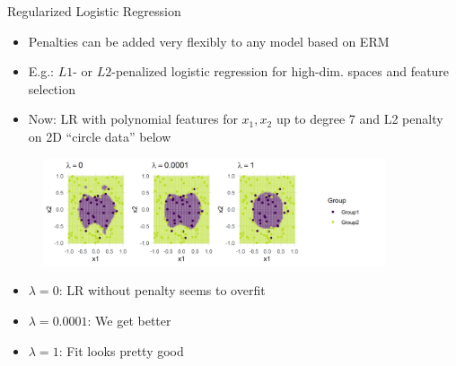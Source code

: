 \documentclass[11pt,compress,t,notes=noshow, xcolor=table]{beamer}
\begin{document}

\begin{vbframe}{Regularized Logistic Regression}

\begin{itemize}

\item Penalties can be added very flexibly to any model based on ERM

\item E.g.: $L1$- or $L2$-penalized logistic regression for high-dim. spaces and feature selection



\item Now: LR with polynomial features for $x_1, x_2$ up to degree 7 and L2 penalty on 2D ``circle data'' below

\end{itemize}

\begin{figure}
\includegraphics[width=0.9\textwidth]{figure/reg_logreg.png}\\
\end{figure}

\begin{itemize}
\item $\lambda = 0$: LR without penalty seems to overfit
\item $\lambda = 0.0001$: We get better
\item $\lambda = 1$: Fit looks pretty good
\end{itemize}


\end{vbframe}


\endlecture
\end{document}

